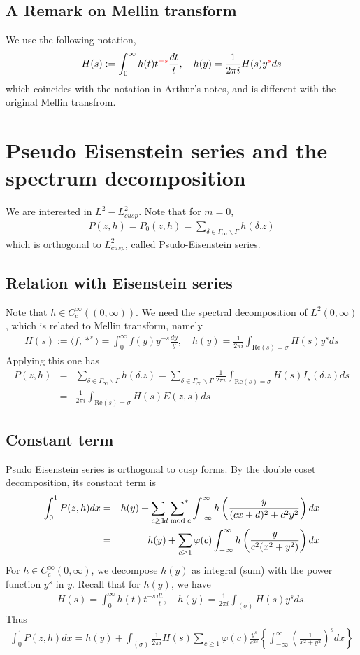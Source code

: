 \documentclass[11pt,reqno]{amsart}
\newcommand{\bna}{\begin{eqnarray*}}
\newcommand{\ena}{\end{eqnarray*}}
\def\re{{\mathrm{Re}}}
\theoremstyle{definition}
\begin{document}
\subsection{A Remark on Mellin transform}
We use the following notation,
\bna
H(s):=\int_0^\infty h(t)t^{\color{red}-s}\frac{dt}{t},
\quad h(y)=\frac{1}{2\pi i}H(s)y^{\color{red}s}ds
\ena
which coincides with the notation in Arthur's notes, and is different with the original Mellin transfrom.
\section{Pseudo Eisenstein series and the spectrum decomposition}
We are interested in $L^2-L^2_{cusp}$.
Note that for $m=0$,
\bna
P(z,h)=P_0(z,h)=\sum_{\delta\in\Gamma_\infty\backslash\Gamma}h(\delta.z)
\ena
which  is orthogonal to $L^2_{cusp}$, called \underline{Psudo-Eisenstein series}.
\subsection{Relation with Eisenstein series}
Note that $h\in C_c^\infty((0,\infty))$. We need the spectral decomposition of $L^2(0,\infty)$, which is related to Mellin transform, namely
\bna
H(s):=\langle f,*^{s}\rangle= \int_0^\infty f(y)y^{-s}\frac{dy}{y},
\quad
h(y)=\frac{1}{2\pi i}\int_{\re(s)=\sigma}H(s) y^{s}ds
\ena
Applying this one has
\bna
P(z,h)&=&\sum_{\delta\in\Gamma_\infty\backslash\Gamma}h(\delta.z)=\sum_{\delta\in\Gamma_\infty\backslash\Gamma}
\frac{1}{2\pi i}\int_{\re(s)=\sigma}H(s) I_{s}(\delta.z)ds\\
&=&\frac{1}{2\pi i}\int_{\re(s)=\sigma} H(s)E(z,s)ds
\ena


\subsection{Constant term}
Psudo Eisenstein series is orthogonal to cusp forms.
By the double coset decomposition, its constant term is
\bna
\int_0^1P(z,h)dx&=&h(y) + \sum_{c\geq 1}\sideset{}{^*}\sum_{d\bmod c}\int_{-\infty}^\infty h\left(\frac{y}{(cx+d)^2+c^2y^2}\right)dx\\
&=&h(y) + \sum_{c\geq 1}\varphi(c)\int_{-\infty}^\infty h\left(\frac{y}{c^2(x^2+y^2)}\right)dx\\
\ena
For $h\in C_c^\infty(0,\infty)$,  we decompose $h(y)$
as integral (sum) with the power function $y^s$ in $y$.
Recall that for $h(y)$, we have
\bna
H(s)=\int_0^\infty h(t)t^{-s}\frac{dt}{t},\quad h(y)=\frac{1}{2\pi i}
\int_{(\sigma)}H(s)y^{s}ds.
\ena
Thus
\bna
\int_0^1P(z,h)dx=h(y) + \int_{(\sigma)}
\frac{1}{2\pi i}H(s)
\sum_{c\geq 1}\varphi(c)
\frac{y^s}{c^{2s}}
\left\{\int_{-\infty}^\infty \left(\frac{1}{x^2+y^2}\right)^sdx\right\}
\ena
\end{document}
